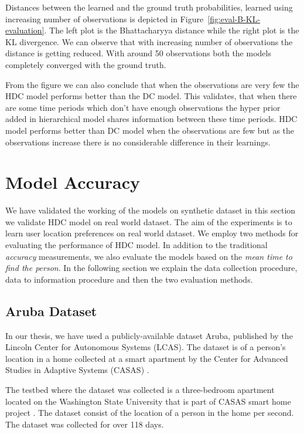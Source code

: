 Distances between the learned and the ground truth probabilities, learned using increasing number of observations is depicted in Figure~\ref{fig:eval-B-KL-evaluation}. The left plot is the Bhattacharyya distance while the right plot is the KL divergence. We can observe that with increasing number of observations the distance is getting reduced. With around 50 observations both the models  completely converged with the ground truth.  

From the figure we can also conclude that when the observations are very few the HDC model performs better than the DC model. This validates, that when there are some time periods which don’t have enough observations the hyper prior added in hierarchical model shares information between these time periods. HDC model performs better than DC model when the observations are few but as the observations increase there is no considerable difference in their learnings.

\section{Model Accuracy}

We have validated the working of the models on synthetic dataset in this section we validate HDC model on real world dataset. The aim of the experiments is to learn user location preferences on real world dataset. We employ two methods for evaluating the performance of HDC model. In addition to the traditional \emph{accuracy} measurements, we also evaluate the models based on the \emph{mean time to find the person}.  In the following section we explain the data collection procedure, data to information procedure and then the two evaluation methods.
 
\subsection{Aruba Dataset}
In our thesis, we have used a  publicly-available  dataset Aruba, published by the Lincoln Center for Autonomous Systems (LCAS). The dataset is of a person's location in a home collected at a smart apartment by the Center for Advanced Studies in Adaptive Systems (CASAS) \cite{aruba} .

The testbed where the dataset was collected is a  three-bedroom apartment located on the Washington State University that is part of CASAS smart home project \cite{aruba}.  The dataset consist of the location of a person in the home per second. The dataset was collected for over 118 days.


